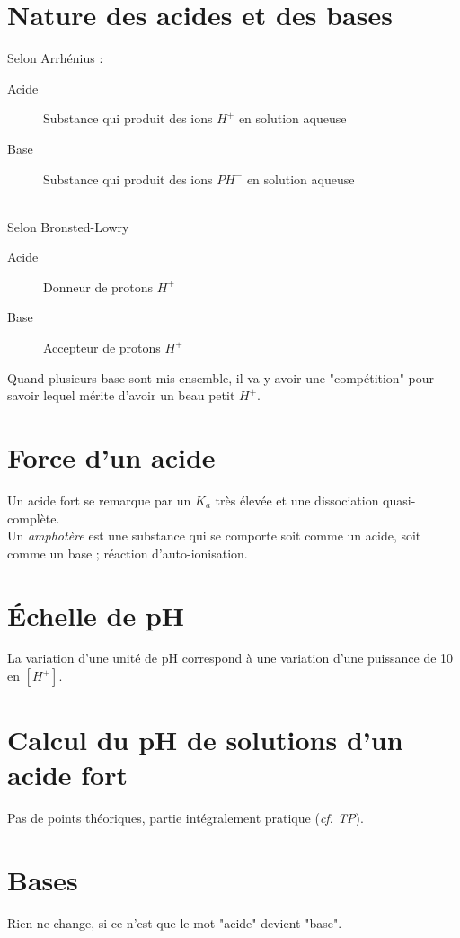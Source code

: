 \documentclass[british,french,11pt, a4paper, openany]{book}
\begin{document}
\section{Nature des acides et des bases}
Selon Arrhénius : 
\begin{description}
	\item[Acide] Substance qui produit des ions $H^+$ en solution aqueuse
	\item[Base] Substance qui produit des ions $PH^-$ en solution aqueuse
\end{description}
\ \\

Selon Bronsted-Lowry 
\begin{description}
	\item[Acide] Donneur de protons $H^+$
	\item[Base] Accepteur de protons $H^+$
\end{description}

Quand plusieurs base sont mis ensemble, il va y avoir une "compétition" pour savoir lequel mérite d'avoir un beau petit $H^+$.

\section{Force d'un acide}
Un acide fort se remarque par un $K_a$ très élevée et une dissociation quasi-complète.\\

Un \textit{amphotère} est une substance qui se comporte soit comme un acide, soit comme un base ; réaction d'auto-ionisation.

\section{Échelle de pH}
La variation d'une unité de pH correspond à une variation d'une puissance de 10 en $[H^+]$.

\section{Calcul du pH de solutions d'un acide fort}
Pas de points théoriques, partie intégralement pratique (\textit{cf. TP}).

\section{Bases}
Rien ne change, si ce n'est que le mot "acide" devient "base".
\end{document}

